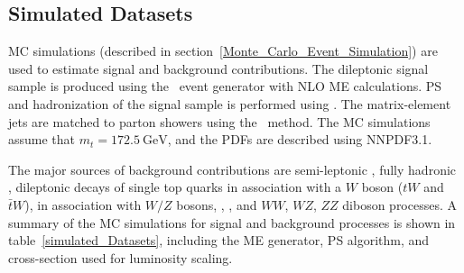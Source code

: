 \subsection{Simulated Datasets}
MC simulations (described in section~\ref{Monte_Carlo_Event_Simulation}) are used to estimate signal and background contributions. 
The dileptonic \ttbar signal sample is produced using the \Powheg\ event generator with NLO ME calculations. 
PS and hadronization of the \ttbar signal sample is performed using \Pythia. 
The matrix-element jets are matched to parton showers using the \Powheg\ method. 
The MC simulations assume that $m_t = \SI{172.5}{\GeV}$, and the PDFs are described using NNPDF3.1.

The major sources of background contributions are semi-leptonic \ttbar, fully hadronic \ttbar, dileptonic decays of single top quarks in association with a $W$ boson ($tW$ and $\bar{t}W$), \ttbar in association with $W/Z$ bosons, \zjets, \wjets, and $WW$, $WZ$, $ZZ$ diboson processes. 
A summary of the MC simulations for signal and background processes is shown in table~\ref{simulated_Datasets}, including the ME generator, PS algorithm, and cross-section used for luminosity scaling.

